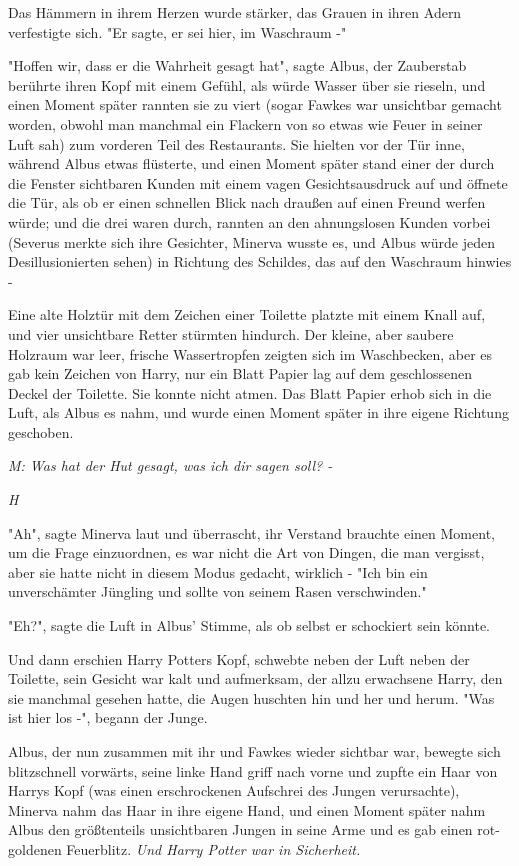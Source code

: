 {Das Hämmern in ihrem Herzen wurde stärker, das Grauen in ihren Adern verfestigte sich. "Er sagte, er sei hier, im Waschraum -"

"Hoffen wir, dass er die Wahrheit gesagt hat", sagte Albus, der Zauberstab berührte ihren Kopf mit einem Gefühl, als würde Wasser über sie rieseln, und einen Moment später rannten sie zu viert (sogar Fawkes war unsichtbar gemacht worden, obwohl man manchmal ein Flackern von so etwas wie Feuer in seiner Luft sah) zum vorderen Teil des Restaurants. Sie hielten vor der Tür inne, während Albus etwas flüsterte, und einen Moment später stand einer der durch die Fenster sichtbaren Kunden mit einem vagen Gesichtsausdruck auf und öffnete die Tür, als ob er einen schnellen Blick nach draußen auf einen Freund werfen würde; und die drei waren durch, rannten an den ahnungslosen Kunden vorbei (Severus merkte sich ihre Gesichter, Minerva wusste es, und Albus würde jeden Desillusionierten sehen) in Richtung des Schildes, das auf den Waschraum hinwies -

Eine alte Holztür mit dem Zeichen einer Toilette platzte mit einem Knall auf, und vier unsichtbare Retter stürmten hindurch. Der kleine, aber saubere Holzraum war leer, frische Wassertropfen zeigten sich im Waschbecken, aber es gab kein Zeichen von Harry, nur ein Blatt Papier lag auf dem geschlossenen Deckel der Toilette. Sie konnte nicht atmen. Das Blatt Papier erhob sich in die Luft, als Albus es nahm, und wurde einen Moment später in ihre eigene Richtung geschoben.

\emph{M: Was hat der Hut gesagt, was ich dir sagen soll? -}

\emph{H}

"Ah", sagte Minerva laut und überrascht, ihr Verstand brauchte einen Moment, um die Frage einzuordnen, es war nicht die Art von Dingen, die man vergisst, aber sie hatte nicht in diesem Modus gedacht, wirklich - "Ich bin ein unverschämter Jüngling und sollte von seinem Rasen verschwinden."

"Eh?", sagte die Luft in Albus' Stimme, als ob selbst er schockiert sein könnte.

Und dann erschien Harry Potters Kopf, schwebte neben der Luft neben der Toilette, sein Gesicht war kalt und aufmerksam, der allzu erwachsene Harry, den sie manchmal gesehen hatte, die Augen huschten hin und her und herum. "Was ist hier los -", begann der Junge.

Albus, der nun zusammen mit ihr und Fawkes wieder sichtbar war, bewegte sich blitzschnell vorwärts, seine linke Hand griff nach vorne und zupfte ein Haar von Harrys Kopf (was einen erschrockenen Aufschrei des Jungen verursachte), Minerva nahm das Haar in ihre eigene Hand, und einen Moment später nahm Albus den größtenteils unsichtbaren Jungen in seine Arme und es gab einen rot-goldenen Feuerblitz. \emph{Und Harry Potter war in Sicherheit.}

}
